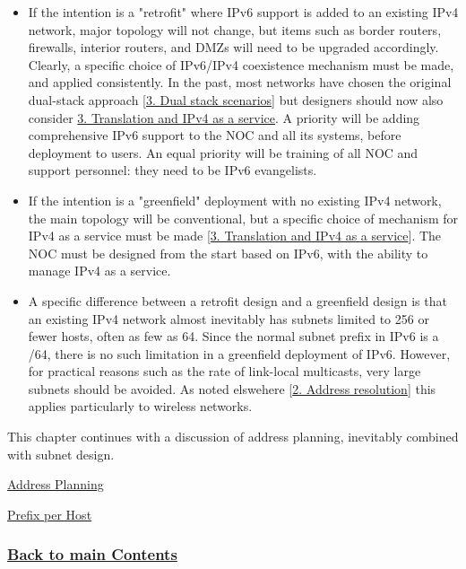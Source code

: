 \documentclass[
]{article}
\begin{document}
\begin{itemize}
\item
  If the intention is a "retrofit" where IPv6 support is added to an
  existing IPv4 network, major topology will not change, but items such
  as border routers, firewalls, interior routers, and DMZs will need to
  be upgraded accordingly. Clearly, a specific choice of IPv6/IPv4
  coexistence mechanism must be made, and applied consistently. In the
  past, most networks have chosen the original dual-stack approach
  {[}\hyperref[dual-stack-scenarios]{3. Dual stack scenarios}{]} but
  designers should now also consider
  \hyperref[translation-and-ipv4-as-a-service]{3. Translation and IPv4
  as a service}. A priority will be adding comprehensive IPv6 support to
  the NOC and all its systems, before deployment to users. An equal
  priority will be training of all NOC and support personnel: they need
  to be IPv6 evangelists.
\item
  If the intention is a "greenfield" deployment with no existing IPv4
  network, the main topology will be conventional, but a specific choice
  of mechanism for IPv4 as a service must be made
  {[}\hyperref[translation-and-ipv4-as-a-service]{3. Translation and
  IPv4 as a service}{]}. The NOC must be designed from the start based
  on IPv6, with the ability to manage IPv4 as a service.
\item
  A specific difference between a retrofit design and a greenfield
  design is that an existing IPv4 network almost inevitably has subnets
  limited to 256 or fewer hosts, often as few as 64. Since the normal
  subnet prefix in IPv6 is a /64, there is no such limitation in a
  greenfield deployment of IPv6. However, for practical reasons such as
  the rate of link-local multicasts, very large subnets should be
  avoided. As noted elswehere {[}\hyperref[address-resolution]{2.
  Address resolution}{]} this applies particularly to wireless networks.
\end{itemize}

This chapter continues with a discussion of address planning, inevitably
combined with subnet design.

\hyperref[address-planning]{Address Planning}

\hyperref[prefix-per-host]{Prefix per Host}

\subsubsection{\texorpdfstring{\hyperref[list-of-contents]{Back to main
Contents}}{Back to main Contents}}\label{back-to-main-contents-4}
\end{document}
